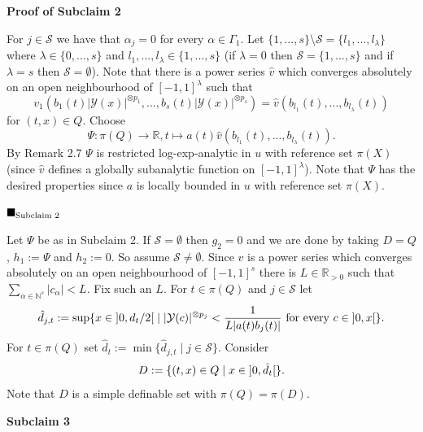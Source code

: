 \documentclass[12pt]{article}
\def\vs{\vspace}
\begin{document}
\vs{0.4cm}
{\bf Proof of Subclaim 2} 

\vs{0.1cm}
For $j \in \mathcal{S}$ we have that $\alpha_j=0$ for every $\alpha \in \Gamma_1$. Let $\{1,...,s\} \setminus \mathcal{S} = \{l_1,...,l_\lambda\}$ where $\lambda \in \{0,...,s\}$ and $l_1,...,l_\lambda \in \{1,...,s\}$ (if $\lambda=0$ then $\mathcal{S}=\{1,...,s\}$ and if $\lambda=s$ then $\mathcal{S}=\emptyset$). Note that there is a power series $\hat{v}$ which converges absolutely on an open neighbourhood of $[-1,1]^\lambda$ such that 
$$v_1(b_1(t)\vert{\mathcal{Y}(x)}\vert^{\otimes p_1},...,b_s(t)\vert{\mathcal{Y}(x)}\vert^{\otimes p_s})= \hat{v}(b_{l_1}(t),...,b_{l_\lambda}(t))$$
for $(t,x) \in Q$. Choose
$$\Psi:\pi(Q) \to \mathbb{R}, t \mapsto a(t) \hat{v}(b_{l_1}(t),...,b_{l_\lambda}(t)).$$
By Remark 2.7 $\Psi$ is restricted log-exp-analytic in $u$ with reference set $\pi(X)$ (since $\hat{v}$ defines a globally subanalytic function on $[-1,1]^\lambda$). Note that $\Psi$ has the desired properties since $a$ is locally bounded in $u$ with reference set $\pi(X)$. 

\hfill$\blacksquare_{\textnormal{Subclaim }2}$

\vs{0.4cm}
Let $\Psi$ be as in Subclaim 2. If $\mathcal{S}=\emptyset$ then $g_2=0$ and we are done by taking $D=Q$, $h_1:=\Psi$ and $h_2:=0$. So assume $\mathcal{S} \neq \emptyset$. Since $v$ is a power series which converges absolutely on an open neighbourhood of $[-1,1]^s$ there is $L \in \mathbb{R}_{>0}$ such that $\sum_{\alpha \in \mathbb{N}^s}\vert{c_\alpha}\vert < L$. Fix such an $L$. For $t \in \pi(Q)$ and $j \in \mathcal{S}$ let
$$\hat{d}_{j,t}:=\sup\{x \in \textnormal{}]0,d_t/2[ \textnormal{} \mid \vert{\mathcal{Y}(c)}\vert^{\otimes p_j} < \frac{1}{L\vert{a(t)b_j(t)}\vert} \textnormal{ for every }c \in \textnormal{} ]0,x[\}.$$
For $t \in \pi(Q)$ set $\hat{d}_t:=\min\{\hat{d}_{j,t} \mid j \in \mathcal{S}\}$. Consider
$$D:=\{(t,x) \in Q \mid x \in \textnormal{} ]0,\hat{d}_t[\}.$$
Note that $D$ is a simple definable set with $\pi(Q)=\pi(D)$.   

\vs{0.4cm}
{\bf Subclaim 3} 
\end{document}
